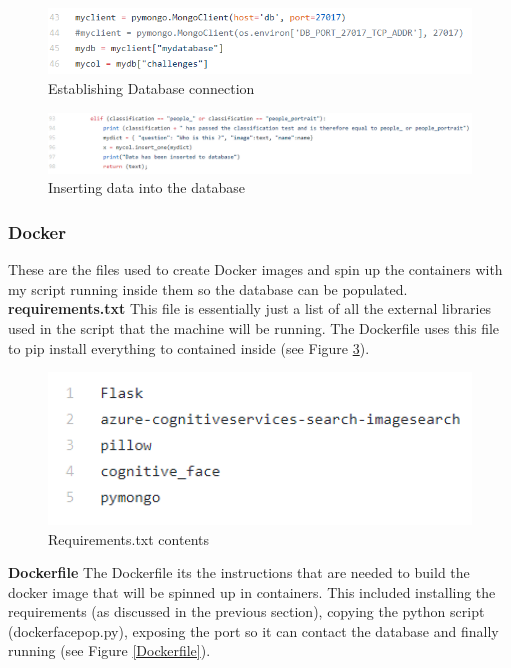 \documentclass[12pt,a4paper]{article}
\begin{document}
\begin{figure}[!ht]
    \centering
    \includegraphics[width=1.0\textwidth]{Figs/dbinsert1.PNG} 
    \caption{Establishing Database connection} 
    \label{dbinsert1}
\end{figure}  

\begin{figure}[!ht]
    \centering
    \includegraphics[width=1.0\textwidth]{Figs/dbinsert2.PNG} 
    \caption{Inserting data into the database} 
    \label{dbinsert2}
\end{figure} 

\subsubsection{Docker}   
These are the files used to create Docker images and spin up the containers with my script running inside them so the database can be populated.  
\textbf{requirements.txt}   
This file is essentially just a list of all the external libraries used in the script that the machine will be running. The Dockerfile uses this file to pip install everything to contained inside (see Figure \ref{req}). 

\begin{figure}[!ht]
    \centering
    \includegraphics[width=1.0\textwidth]{Figs/requirements.PNG} 
    \caption{Requirements.txt contents} 
    \label{req}
\end{figure} 

\textbf{Dockerfile} 
The Dockerfile its the instructions that are needed to build the docker image that will be spinned up in containers.  This included installing the requirements (as discussed in the previous section), copying the python script (docker\textunderscore face\textunderscore pop.py), exposing the port so it can contact the database and finally running (see Figure \ref{Dockerfile}). 
\end{document}
